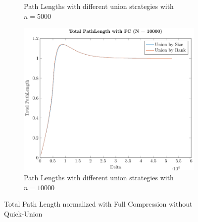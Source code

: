 \begin{figure}[ht]
\begin{subfigure}{0.32\textwidth}
        \caption{Path Lengths with different union strategies with $n = 5000$}
    \end{subfigure}%
    \hfill
    \begin{subfigure}{0.32\textwidth}
        \centering
        \includegraphics[width=\textwidth]{../images/plotFCNonFull10000_PathLength.pdf}
        \caption{Path Lengths with different union strategies with $n = 10000$}
    \end{subfigure}

    \caption{Total Path Length normalized with Full Compression without Quick-Union}
    \label{fig:tplFCNoQU}
\end{figure}

